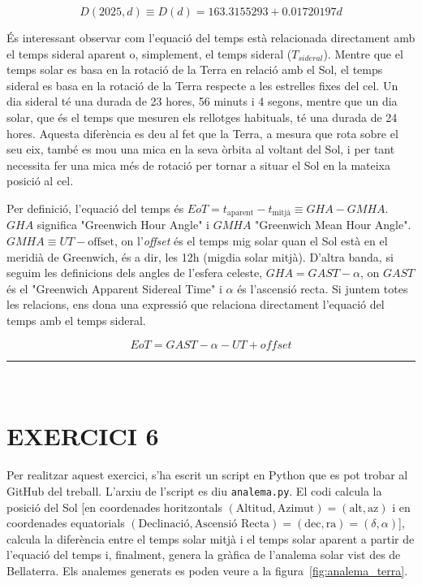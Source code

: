 \documentclass[a4paper, 11pt]{article}
\begin{document}
\begin{equation} \label{D_2025}
    \boxed{D(2025,d) \equiv D(d) = 163.3155293 + 0.01720197d}
\end{equation}
\vspace{2mm}

\noindent És interessant observar com l'equació del temps està relacionada directament amb el temps sideral aparent o, simplement, el temps sideral ($T_{sideral}$). Mentre que el temps solar es basa en la rotació de la Terra en relació amb el Sol, el temps sideral es basa en la rotació de la Terra respecte a les estrelles fixes del cel. Un dia sideral té una durada de 23 hores, 56 minuts i 4 segons, mentre que un dia solar, que és el temps que mesuren els rellotges habituals, té una durada de 24 hores. Aquesta diferència es deu al fet que la Terra, a mesura que rota sobre el seu eix, també es mou una mica en la seva òrbita al voltant del Sol, i per tant necessita fer una mica més de rotació per tornar a situar el Sol en la mateixa posició al cel.

\vspace{2mm}

\noindent Per definició, l'equació del temps és $EoT = t_{\text{aparent}} - t_{\text{mitjà}} \equiv GHA - GMHA$. $GHA$ significa "Greenwich Hour Angle" i $GMHA$ "Greenwich Mean Hour Angle". $GMHA \equiv UT - \text{offset}$, on l'\textit{offset} és el temps mig solar quan el Sol està en el meridià de Greenwich, és a dir, les 12h (migdia solar mitjà). D'altra banda, si seguim les definicions dels angles de l'esfera celeste, $GHA = GAST - \alpha$, on $GAST$ és el "Greenwich Apparent Sidereal Time" i $\alpha$ és l'ascensió recta. Si juntem totes les relacions, ens dona una expressió que relaciona directament l'equació del temps amb el temps sideral.

\begin{equation}
    EoT = GAST - \alpha - UT + offset
    \label{eq:EoT_ST}
\end{equation}

\vspace{10mm}
\hrule\
\vspace{5mm}


\section*{EXERCICI 6}

\noindent Per realitzar aquest exercici, s'ha escrit un script en Python que es pot trobar al GitHub del treball. L'arxiu de l'script es diu \texttt{analema.py}. El codi calcula la posició del Sol [en coordenades horitzontals $(\text{Altitud}, \text{Azimut}) = (\text{alt}, \text{az})$ i en coordenades equatorials $(\text{Declinació}, \text{Ascensió Recta}) = (\text{dec}, \text{ra}) = (\delta, \alpha)$], calcula la diferència entre el temps solar mitjà i el temps solar aparent a partir de l’equació del temps i, finalment, genera la gràfica de l’analema solar vist des de Bellaterra. Els analemes generats es poden veure a la figura~\ref{fig:analema_terra}.
\end{document}
